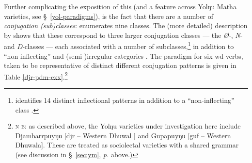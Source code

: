 Further complicating the exposition of this (and a feature across Yolŋu Matha varieties, see \S~\ref{yol-paradigms}), is the fact that there are a number of \textit{conjugation (sub)classes}: \citet{Lowe1996} enumerates nine classes. The (more detailed) description by \citet{Wilkinson1991} shows that these correspond to three larger conjugation classes --- the \textit{Ø-}, \textit{N}- and \textit{Ŋ-}classes --- each associated with a number of subclasses,\footnote{\citeauthor{Wilkinson1991} identifies 14 distinct inflectional patterns in addition to a ``non-inflecting'' class \citeyearpar[307]{Wilkinson1991}.} in addition to ``non-inflecting'' and (semi-)irregular categories \citep{Wilkinson1991}. The paradigm for six \gls{wd} verbs, taken to be representative of distinct different conjugation patterns is given in Table \ref{djr-pdm-exx}.\footnote{\textsc{n\kern -2pt b:} as described above, the Yolŋu varieties under investigation here include Djambarrpuyŋu [\gls{djr} -- Western Dhuwal ] and Gupapuyŋu [\gls{guf} -- Western Dhuwala]. These are treated as sociolectal varieties with a shared grammar (see discussion in \S~\ref{sec:ym}, \textit{p.} \pageref{sec:ym} above.) } 

